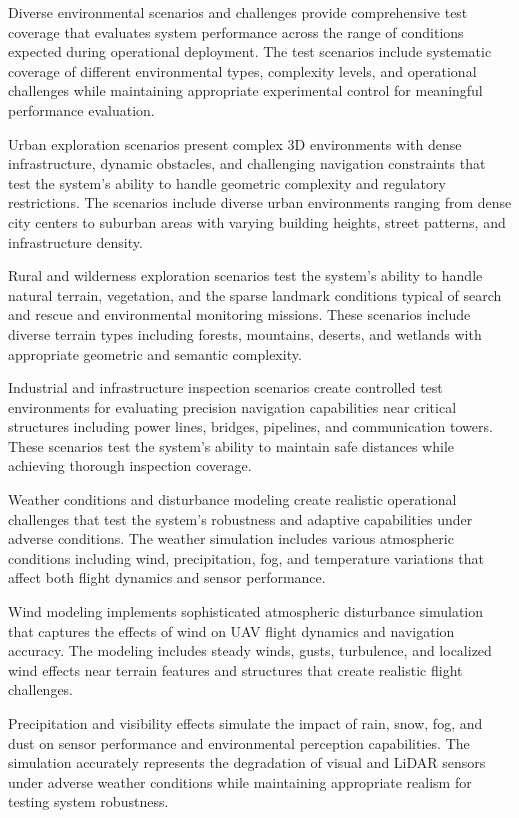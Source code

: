 Diverse environmental scenarios and challenges provide comprehensive test coverage that evaluates system performance across the range of conditions expected during operational deployment. The test scenarios include systematic coverage of different environmental types, complexity levels, and operational challenges while maintaining appropriate experimental control for meaningful performance evaluation.

Urban exploration scenarios present complex 3D environments with dense infrastructure, dynamic obstacles, and challenging navigation constraints that test the system's ability to handle geometric complexity and regulatory restrictions. The scenarios include diverse urban environments ranging from dense city centers to suburban areas with varying building heights, street patterns, and infrastructure density.

Rural and wilderness exploration scenarios test the system's ability to handle natural terrain, vegetation, and the sparse landmark conditions typical of search and rescue and environmental monitoring missions. These scenarios include diverse terrain types including forests, mountains, deserts, and wetlands with appropriate geometric and semantic complexity.

Industrial and infrastructure inspection scenarios create controlled test environments for evaluating precision navigation capabilities near critical structures including power lines, bridges, pipelines, and communication towers. These scenarios test the system's ability to maintain safe distances while achieving thorough inspection coverage.

Weather conditions and disturbance modeling create realistic operational challenges that test the system's robustness and adaptive capabilities under adverse conditions. The weather simulation includes various atmospheric conditions including wind, precipitation, fog, and temperature variations that affect both flight dynamics and sensor performance.

Wind modeling implements sophisticated atmospheric disturbance simulation that captures the effects of wind on UAV flight dynamics and navigation accuracy. The modeling includes steady winds, gusts, turbulence, and localized wind effects near terrain features and structures that create realistic flight challenges.

Precipitation and visibility effects simulate the impact of rain, snow, fog, and dust on sensor performance and environmental perception capabilities. The simulation accurately represents the degradation of visual and LiDAR sensors under adverse weather conditions while maintaining appropriate realism for testing system robustness.

